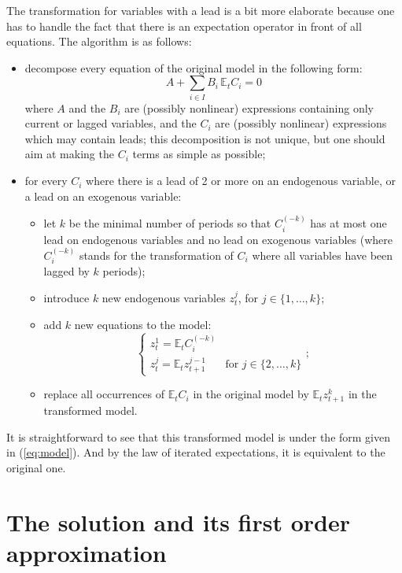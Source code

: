\documentclass[11pt,a4paper]{article}
\begin{document}
The transformation for variables with a lead is a bit more elaborate because
one has to handle the fact that there is an expectation operator in front of
all equations. The algorithm is as follows:
\begin{itemize}
\item decompose every equation of the original model in the following form:
  \begin{equation*}
    A + \sum_{i\in I} B_i \, \mathbb{E}_t C_i = 0
  \end{equation*}
  where $A$ and the $B_i$ are (possibly nonlinear) expressions containing only
  current or lagged variables, and the $C_i$ are (possibly nonlinear)
  expressions which may contain leads; this decomposition is not unique, but
  one should aim at making the $C_i$ terms as simple as possible;
\item for every $C_i$ where there is a lead of 2 or more on an endogenous
  variable, or a lead on an exogenous variable:
  \begin{itemize}
  \item let $k$ be the minimal number of periods so that $C_i^{(-k)}$ has at
    most one lead on endogenous variables and no lead on exogenous variables
    (where $C_i^{(-k)}$ stands for the transformation of $C_i$ where all
    variables have been lagged by $k$ periods);
  \item introduce $k$ new endogenous variables $z^j_t$, for
    $j\in\{1,\ldots,k\}$;
  \item add $k$ new equations to the model:
    \begin{equation*}
      \left\{\begin{array}{ll}
          z^1_t = \mathbb{E}_tC_i^{(-k)} & \\
          z^j_t = \mathbb{E}_tz^{j-1}_{t+1} & \text{for } j\in\{2, \ldots,k\}
        \end{array}\right.;
    \end{equation*}
  \item replace all occurrences of $\mathbb{E}_t C_i$ in the original model
    by $\mathbb{E}_tz^k_{t+1}$ in the transformed model.
  \end{itemize}
\end{itemize}
It is straightforward to see that this transformed model is under the form
given in (\ref{eq:model}). And by the law of iterated expectations, it is
equivalent to the original one.

\section{The solution and its first order approximation}
\label{sec:first-order}
\end{document}
